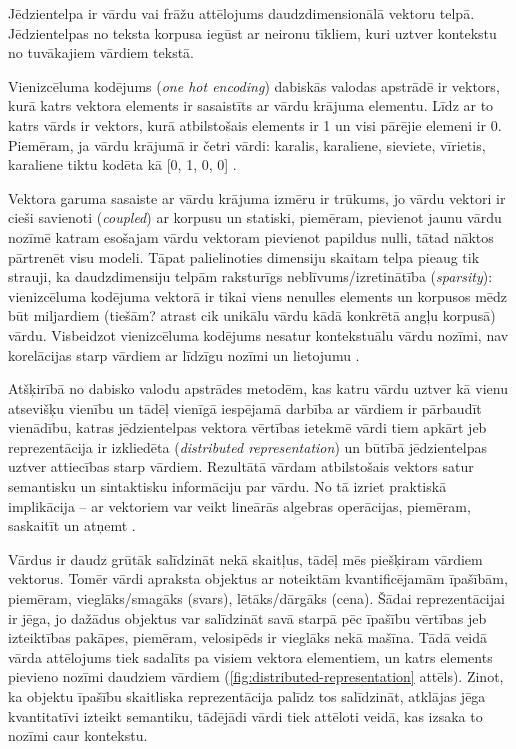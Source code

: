 Jēdzientelpa ir vārdu vai frāžu attēlojums daudzdimensionālā vektoru telpā. Jēdzientelpas no teksta korpusa iegūst ar neironu tīkliem, kuri uztver kontekstu no tuvākajiem vārdiem tekstā.


Vienizcēluma kodējums (\textit{one hot encoding}) dabiskās valodas apstrādē ir vektors, kurā katrs vektora elements ir sasaistīts ar vārdu krājuma elementu. Līdz ar to katrs vārds ir vektors, kurā atbilstošais elements ir 1 un visi pārējie elemeni ir 0. Piemēram, ja vārdu krājumā ir četri vārdi: karalis, karaliene, sieviete, vīrietis, karaliene tiktu kodēta kā [0, 1, 0, 0] \cite{colyer2016}.

Vektora garuma sasaiste ar vārdu krājuma izmēru ir trūkums, jo vārdu vektori ir cieši savienoti (\textit{coupled}) ar korpusu un statiski, piemēram, pievienot jaunu vārdu nozīmē katram esošajam vārdu vektoram pievienot papildus nulli, tātad nāktos pārtrenēt visu modeli. Tāpat palielinoties dimensiju skaitam telpa pieaug tik strauji, ka daudzdimensiju telpām raksturīgs neblīvums/izretinātība (\textit{sparsity}): vienizcēluma kodējuma vektorā ir tikai viens nenulles elements un korpusos mēdz būt miljardiem (tiešām? atrast cik unikālu vārdu kādā konkrētā angļu korpusā) vārdu. Visbeidzot vienizcēluma kodējums nesatur kontekstuālu vārdu nozīmi, nav korelācijas starp vārdiem ar līdzīgu nozīmi un lietojumu \cite{colyer2016}.

Atšķirībā no dabisko valodu apstrādes metodēm, kas katru vārdu uztver kā vienu atsevišķu vienību un tādēļ vienīgā iespējamā darbība ar vārdiem ir pārbaudīt vienādību, katras jēdzientelpas vektora vērtības ietekmē vārdi tiem apkārt jeb reprezentācija ir izkliedēta (\textit{distributed representation}) un būtībā jēdzientelpas uztver attiecības starp vārdiem. Rezultātā vārdam atbilstošais vektors satur semantisku un sintaktisku informāciju par vārdu. No tā izriet praktiskā implikācija -- ar vektoriem var veikt lineārās algebras operācijas, piemēram, saskaitīt un atņemt \cite{colyer2016}.

Vārdus ir daudz grūtāk salīdzināt nekā skaitļus, tādēļ mēs piešķiram vārdiem vektorus. Tomēr vārdi apraksta objektus ar noteiktām kvantificējamām īpašībām, piemēram, vieglāks/smagāks (svars), lētāks/dārgāks (cena). Šādai reprezentācijai ir jēga, jo dažādus objektus var salīdzināt savā starpā pēc īpašību vērtības jeb izteiktības pakāpes, piemēram, velosipēds ir vieglāks nekā mašīna. Tādā veidā vārda attēlojums tiek sadalīts pa visiem vektora elementiem, un katrs elements pievieno nozīmi daudziem vārdiem (\ref{fig:distributed-representation} attēls). Zinot, ka objektu īpašību skaitliska reprezentācija palīdz tos salīdzināt, atklājas jēga kvantitatīvi izteikt semantiku, tādējādi vārdi tiek attēloti veidā, kas izsaka to nozīmi caur kontekstu. 

